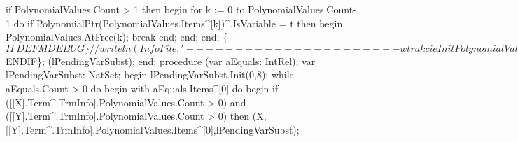             if PolynomialValues.Count > 1 then
            begin
               for k := 0 to PolynomialValues.Count-1 do
                  if PolynomialPtr(PolynomialValues.Items^[k])^.IsVariable = t then
                  begin PolynomialValues.AtFree(k);
                  break
                  end;
            end;
         end;
   \{$IFDEF MDEBUG\}
   //writeln(InfoFile,'---------------------- w trakcie InitPolynomialValues');
   //infoeqclasses;
   //writeln(InfoFile,'---------------------- koniec wydruku w trakcie InitPolynomialValues');
   \{$ENDIF\};
   (lPendingVarSubst);
end;
\eatline
{}\nwendcode{}\nwdocspar
\nwenddocs{}\endmoddef\nwstartdeflinemarkup\nwenddeflinemarkup
procedure (var aEquals: IntRel);
var
   lPendingVarSubst: NatSet;
begin
   lPendingVarSubst.Init(0,8);
   while aEquals.Count > 0 do
   begin
      with aEquals.Items^[0] do
      begin
         if ([[X].Term^.TrmInfo].PolynomialValues.Count > 0) and
               ([[Y].Term^.TrmInfo].PolynomialValues.Count > 0) then
            (X,[[Y].Term^.TrmInfo].PolynomialValues.Items^[0],lPendingVarSubst);
